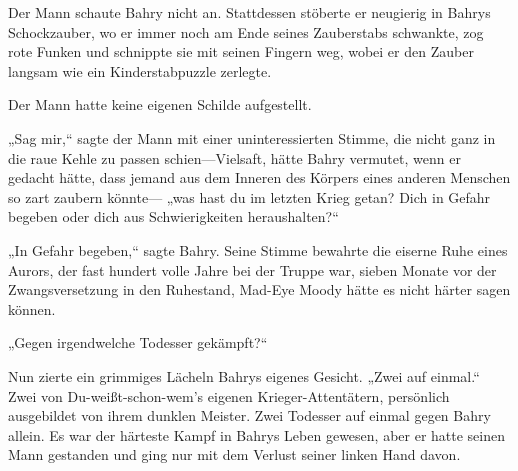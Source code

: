 Der Mann schaute Bahry nicht an. Stattdessen stöberte er neugierig in Bahrys Schockzauber, wo er immer noch am Ende seines Zauberstabs schwankte, zog rote Funken und schnippte sie mit seinen Fingern weg, wobei er den Zauber langsam wie ein Kinderstabpuzzle zerlegte.

Der Mann hatte keine eigenen Schilde aufgestellt.

„Sag mir,“ sagte der Mann mit einer uninteressierten Stimme, die nicht ganz in die raue Kehle zu passen schien—Vielsaft, hätte Bahry vermutet, wenn er gedacht hätte, dass jemand aus dem Inneren des Körpers eines anderen Menschen so zart zaubern könnte— „was hast du im letzten Krieg getan? Dich in Gefahr begeben oder dich aus Schwierigkeiten heraushalten?“

„In Gefahr begeben,“ sagte Bahry. Seine Stimme bewahrte die eiserne Ruhe eines Aurors, der fast hundert volle Jahre bei der Truppe war, sieben Monate vor der Zwangsversetzung in den Ruhestand, Mad-Eye Moody hätte es nicht härter sagen können.

„Gegen irgendwelche Todesser gekämpft?“

Nun zierte ein grimmiges Lächeln Bahrys eigenes Gesicht. „Zwei auf einmal.“ Zwei von Du-weißt-schon-wem's eigenen Krieger-Attentätern, persönlich ausgebildet von ihrem dunklen Meister. Zwei Todesser auf einmal gegen Bahry allein. Es war der härteste Kampf in Bahrys Leben gewesen, aber er hatte seinen Mann gestanden und ging nur mit dem Verlust seiner linken Hand davon.

